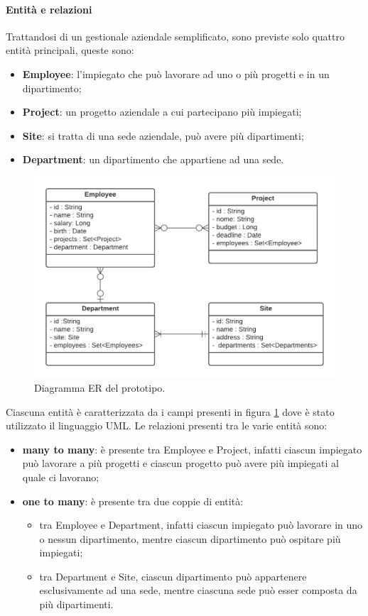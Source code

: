 \paragraph{Entità e relazioni}
\label{entity-relation}
Trattandosi di un gestionale aziendale semplificato, sono previste solo quattro entità principali, queste sono:
\begin{itemize}
  \item \textbf{Employee}: l'impiegato che può lavorare ad uno o più progetti e in un dipartimento;
  \item \textbf{Project}: un progetto aziendale a cui partecipano più impiegati;
  \item \textbf{Site}: si tratta di una sede aziendale, può avere più dipartimenti;
  \item \textbf{Department}: un dipartimento che appartiene ad una sede.
\end{itemize}
\FloatBarrier
\begin{figure}[!ht]
\centering
\includegraphics[width=0.8\linewidth]{immagini/ER_prototype.pdf}
\caption{Diagramma ER del prototipo.}
\label{ER-prototype}
\end{figure}
\FloatBarrier
Ciascuna entità è caratterizzata da i campi presenti in figura \ref{ER-prototype} dove è stato utilizzato il linguaggio UML. Le relazioni presenti tra le varie entità sono:
\begin{itemize}
  \item \textbf{many to many}: è presente tra Employee e Project, infatti ciascun impiegato può lavorare a più progetti e ciascun progetto può avere più impiegati al quale ci lavorano;
  \item \textbf{one to many}: è presente tra due coppie di entità:
    \begin{itemize}
      \item tra Employee e Department, infatti ciascun impiegato può lavorare in uno o nessun dipartimento, mentre ciascun dipartimento può ospitare più impiegati;
      \item tra Department e Site, ciascun dipartimento può appartenere esclusivamente ad una sede, mentre ciascuna sede può esser composta da più dipartimenti.
    \end{itemize}
\end{itemize}
